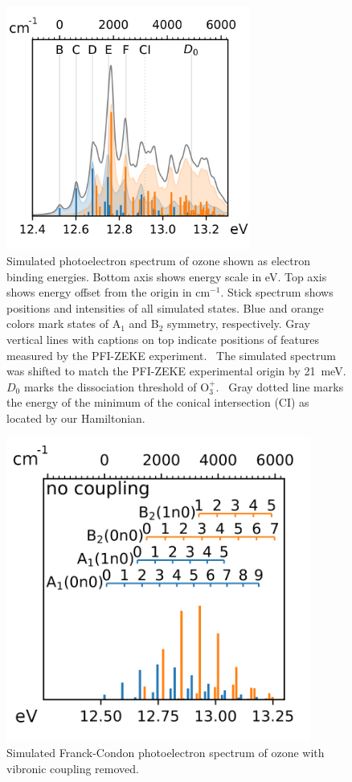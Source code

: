 \documentclass[12pt,prb,aps]{revtex4}
\begin{document}
\begin{figure}[h!]
\includegraphics[width=8cm]{figures/spectrum_overline.png}
\caption{
        Simulated photoelectron spectrum of ozone shown as electron binding energies. Bottom axis shows energy
        scale in eV.  
        Top axis shows energy offset from the origin in
        cm$^{-1}$. 
        Stick spectrum shows positions and intensities of all
        simulated states. Blue and orange colors mark states of A$_1$ and
        B$_2$ symmetry, respectively. Gray vertical lines with captions on top
        indicate positions of features measured by the PFI-ZEKE
        experiment.~\cite{Willitsch:O3ZEKE:2005} The simulated spectrum was
        shifted to match the PFI-ZEKE experimental origin by 21~meV. 
        $D_0$ marks the dissociation threshold of O$_3^+$.~\cite{Willitsch:O3ZEKE:2005}
        Gray dotted line marks the energy of the minimum of the conical
        intersection (CI) as located by our Hamiltonian.
    \label{fig:ozone_overlay}}
\end{figure}

\begin{figure}[h!]
    \includegraphics[width=10cm]{figures/spectrum_assigned.png}
    \caption{Simulated Franck-Condon photoelectron spectrum of ozone with vibronic
        coupling removed.
    \label{fig:no_coupling}}
\end{figure}
\end{document}
